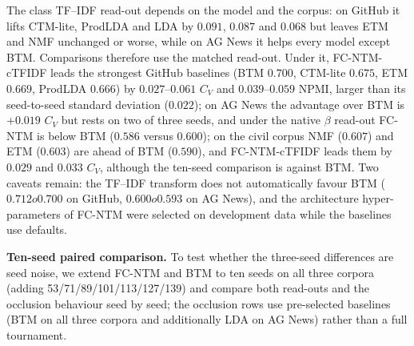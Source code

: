 \documentclass[Journal,letterpaper,NoLists]{ascelike-new}
\newcommand{\fcntm}{FC-NTM}
\begin{document}
The class TF--IDF read-out depends on the model and the corpus: on GitHub it lifts CTM-lite,
ProdLDA and LDA by $0.091$, $0.087$ and $0.068$ but leaves ETM and NMF unchanged or worse, while on
AG News it helps every model except BTM. Comparisons therefore use the matched read-out. Under it,
\fcntm{}-cTFIDF leads the strongest GitHub baselines (BTM $0.700$, CTM-lite $0.675$, ETM $0.669$,
ProdLDA $0.666$) by $0.027$--$0.061$ $C_V$ and $0.039$--$0.059$ NPMI, larger than its seed-to-seed
standard deviation ($0.022$); on AG News the advantage over BTM is $+0.019$ $C_V$ but rests on two
of three seeds, and under the native $\beta$ read-out \fcntm{} is below BTM ($0.586$ versus
$0.600$); on the civil corpus NMF ($0.607$) and ETM ($0.603$) are ahead of BTM ($0.590$), and
\fcntm{}-cTFIDF leads them by $0.029$ and $0.033$ $C_V$, although the ten-seed comparison is
against BTM. Two caveats remain: the TF--IDF transform does not automatically favour BTM
($0.712	o0.700$ on GitHub, $0.600	o0.593$ on AG News), and the architecture hyper-parameters
of \fcntm{} were selected on development data while the baselines use defaults.

\noindent\textbf{Ten-seed paired comparison.} To test whether the three-seed differences are seed noise, we extend \fcntm{} and BTM to ten seeds
on all three corpora (adding 53/71/89/101/113/127/139) and compare both read-outs and the
occlusion behaviour seed by seed; the occlusion rows use pre-selected baselines (BTM on all three
corpora and additionally LDA on AG News) rather than a full tournament.
\end{document}
